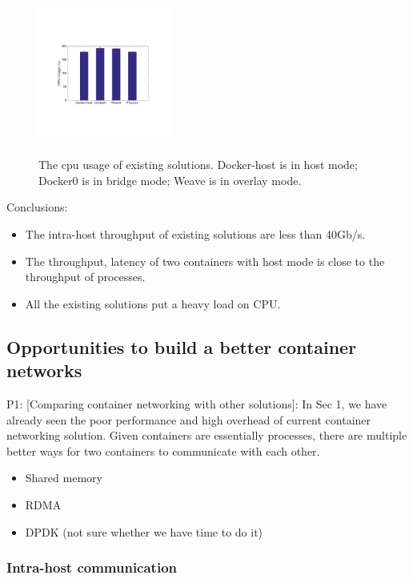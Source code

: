 \begin{figure}[ht]
     \centering 
     \includegraphics[width=0.4\textwidth]{figures/motivation/eval_exist_cpu.pdf} 
     \label{fig:eval_exist_cpu}
     \caption{The cpu usage of existing solutions. Docker-host is in host mode; Docker0 is in bridge mode; Weave is in overlay mode.} 
\end{figure} 

Conclusions:
\begin{itemize}
  \item The intra-host throughput of existing solutions are less than 40Gb/s.
  \item The throughput, latency of two containers with host mode is close to the throughput of processes.
  \item All the existing solutions put a heavy load on CPU.
\end{itemize}

\subsection{Opportunities to build a better container networks}
P1: [Comparing container networking with other solutions]: In Sec 1, we have already seen the poor performance and high overhead of current container networking solution. Given containers are essentially processes, there are multiple better ways for two containers to communicate with each other.

\begin{itemize}
  \item Shared memory
  \item RDMA
  \item DPDK (not sure whether we have time to do it)
\end{itemize}

\subsubsection{Intra-host communication}


